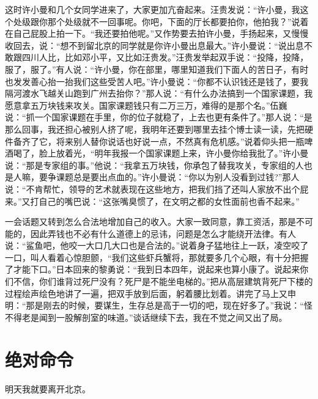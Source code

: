 \documentclass[12pt,oneside]{book}
\begin{document}
这时许小曼和几个女同学进来了，大家更加亢奋起来。汪贵发说：``许小曼，我这个处级跟你那个处级就不一回事呢。你吧，下面的厅长都要拍你，他拍我？''说着在自己屁股上拍一下。``我还要拍他呢。''又作势要去拍许小曼，手扬起来，又慢慢收回去，说：``想不到留北京的同学就是你许小曼出息最大。''许小曼说：``说出息不敢跟四川人比，比如邓小平，又比如汪贵发。''汪贵发举起双手说：``投降，投降，服了，服了。''有人说：``许小曼，你在部里，哪里知道我们下面人的苦日子，有时也发发善心抬一抬我们这些受苦人吧。''许小曼说：``你都不认识钱还是钱了，要我隔河渡水飞越关山跑到广州去抬你？''那人说：``有什么办法搞到一个国家课题，我愿意拿五万块钱来攻关。国家课题钱只有二万三万，难得的是那个名。''伍巍说：``抓一个国家课题在手里，你的位子就稳了，上去也更有条件了。''那人说：``是那么回事，我还担心被别人挤了呢，我明年还要到哪里去挂个博士读一读，先把硬件备齐了它，将来别人替你说话也好说一点，不然真有危机感。''说着仰头把一瓶啤酒喝了，脸上放着光，``明年我报一个国家课题上来，许小曼你给我批了。''许小曼说：``那是专家组的事。''他说：``我拿五万块钱，你承包了替我攻关，专家组的人也是人嘛，要争课题总是要出点血的。''许小曼说：``你以为别人没看到过钱?''那人说：``不肯帮忙，领导的艺术就表现在这些地方，把我们挡了还叫人家放不出个屁来。''又打自己的嘴巴说：``这张嘴臭惯了，在文明之都的女性面前也香不起来。''

一会话题又转到怎么合法地增加自己的收入。大家一致同意，靠工资活，那是不可能的，因此弄钱也不必有什么道德上的忌讳，问题是怎么才能绕开法律。有人说：``鲨鱼吧，他咬一大口几大口也是合法的。''说着身子猛地往上一跃，凌空咬了一口，叫人看着心惊胆颤，``我们这些虾兵蟹将，那就要多几个心眼，有十分把握了才能下口。''日本回来的黎勇说：``我到日本四年，说起来也算小康了。说起来你们不信，你们谁背过死尸没有？死尸是不能坐电梯的。''把从高层建筑背死尸下楼的过程绘声绘色地讲了一遍，把双手放到后面，躬着腰比划着。讲完了马上又申明：``那是刚去的时候，要谋生，生存总是高于一切的吧，现在好多了。''我说：``怪不得老是闻到一股解剖室的味道。''谈话继续下去，我在不觉之间又出了局。


\chapter{绝对命令}

明天我就要离开北京。
\end{document}
